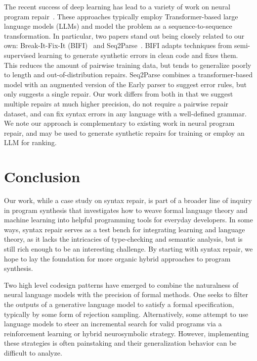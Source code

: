 \documentclass[sigplan,review,acmsmall,nonacm,anonymous]{acmart}\settopmatter{printfolios=false,printccs=false,printacmref=false}
\begin{document}
  The recent success of deep learning has lead to a variety of work on neural program repair~\cite{allamanis2021self, chirkova2021empirical, drain2021generating}. These approaches typically employ Transformer-based large language models (LLMs) and model the problem as a sequence-to-sequence transformation. In particular, two papers stand out being closely related to our own: Break-It-Fix-It (BIFI)~\cite{yasunaga2021break} and Seq2Parse~\cite{sakkas2022seq2parse}. BIFI adapts techniques from semi-supervised learning to generate synthetic errors in clean code and fixes them. This reduces the amount of pairwise training data, but tends to generalize poorly to length and out-of-distribution repairs. Seq2Parse combines a transformer-based model with an augmented version of the Early parser to suggest error rules, but only suggests a single repair. Our work differs from both in that we suggest multiple repairs at much higher precision, do not require a pairwise repair dataset, and can fix syntax errors in any language with a well-defined grammar. We note our approach is complementary to existing work in neural program repair, and may be used to generate synthetic repairs for training or employ an LLM for ranking.

  \clearpage\section{Conclusion}\label{sec:conclusion}

  Our work, while a case study on syntax repair, is part of a broader line of inquiry in program synthesis that investigates how to weave formal language theory and machine learning into helpful programming tools for everyday developers. In some ways, syntax repair serves as a test bench for integrating learning and language theory, as it lacks the intricacies of type-checking and semantic analysis, but is still rich enough to be an interesting challenge. By starting with syntax repair, we hope to lay the foundation for more organic hybrid approaches to program synthesis.

  Two high level codesign patterns have emerged to combine the naturalness of neural language models with the precision of formal methods. One seeks to filter the outputs of a generative language model to satisfy a formal specification, typically by some form of rejection sampling. Alternatively, some attempt to use language models to steer an incremental search for valid programs via a reinforcement learning or hybrid neurosymbolic strategy. However, implementing these strategies is often painstaking and their generalization behavior can be difficult to analyze.
\end{document}
